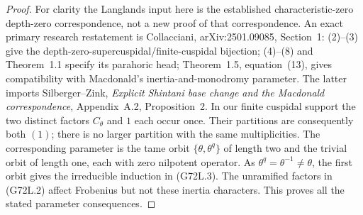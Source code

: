 \begin{proof}
For clarity the Langlands input here is the established
characteristic-zero depth-zero correspondence, not a new
proof of that correspondence.  An exact primary research
restatement is Collacciani, arXiv:2501.09085, Section~1:
(2)--(3) give the depth-zero-supercuspidal/finite-cuspidal
bijection; (4)--(8) and Theorem~1.1 specify its parahoric
head; Theorem~1.5, equation~(13), gives compatibility with
Macdonald's inertia-and-monodromy parameter.  The latter
imports Silberger--Zink, \emph{Explicit Shintani base change
and the Macdonald correspondence}, Appendix~A.2,
Proposition~2.  In our finite cuspidal support the two distinct
factors $C_\theta$ and $1$ each occur once.  Their partitions
are consequently both $(1)$; there is no larger partition
with the same multiplicities.  The corresponding parameter
is the tame orbit $\{\theta,\theta^q\}$ of length two and
the trivial orbit of length one, each with zero nilpotent
operator.  As $\theta^q=\theta^{-1}\ne\theta$, the first
orbit gives the irreducible induction in (G72L.3).
The unramified factors in (G72L.2) affect Frobenius but not
these inertia characters.  This proves all the stated
parameter consequences.
\end{proof}

